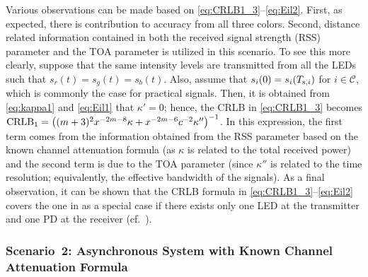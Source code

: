\documentclass[10pt,twocolumn]{IEEEtran}
\newcommand{\CRLB}{{\rm{CRLB}}}
\newcommand{\Tsi}{{T_{{\rm{s}},i}}}
\newcommand{\mtC}{{\mathcal{C}}}
\begin{document}
Various observations can be made based on \eqref{eq:CRLB1_3}--\eqref{eq:Eil2}. First, as expected, there is contribution to accuracy from all three colors. Second, distance related information contained in both the received signal strength (RSS) parameter and the TOA parameter is utilized in this scenario. To see this more clearly, suppose that the same intensity levels are transmitted from all the LEDs such that $s_r(t)=s_g(t)=s_b(t)$. Also, assume that $s_i(0)=s_i(\Tsi)$ for $i\in\mtC$, which is commonly the case for practical signals. Then, it is obtained from \eqref{eq:kappa1} and \eqref{eq:Eil1} that $\kappa'=0$; hence, the CRLB in \eqref{eq:CRLB1_3} becomes $\CRLB_1=\big((m+3)^2x^{-2m-8}\kappa+{x^{-2m-6}}{c^{-2}}\kappa''\big)^{-1}$. In this expression, the first term comes from the information obtained from the RSS parameter based on the known channel attenuation formula (as $\kappa$ is related to the total received power) and the second term is due to the TOA parameter (since $\kappa''$ is related to the time resolution; equivalently, the effective bandwidth of the signals). As a final observation, it can be shown that the CRLB formula in \eqref{eq:CRLB1_3}--\eqref{eq:Eil2} covers the one in \cite{MFK_CRLB} as a special case if there exists only one LED at the transmitter and one PD at the receiver (cf.~\cite[Sec.~III-A]{MFK_CRLB}).

\subsubsection{Scenario~2: Asynchronous System with Known Channel Attenuation Formula}\label{sec:Case2}
\end{document}
